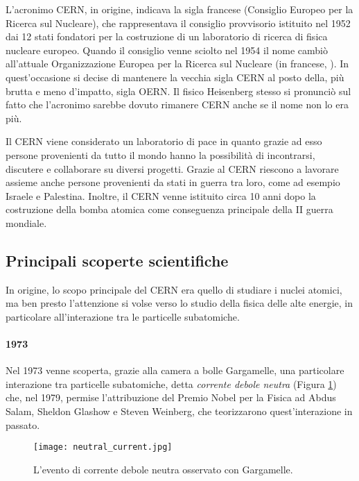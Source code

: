 		L'acronimo \ac{CERN}, in origine, indicava la sigla francese \emph{} (Consiglio Europeo per la Ricerca sul Nucleare), che rappresentava il consiglio provvisorio istituito nel 1952 dai 12 stati fondatori per la costruzione di un laboratorio di ricerca di fisica nucleare europeo. Quando il consiglio venne sciolto nel 1954 il nome cambiò all'attuale Organizzazione Europea per la Ricerca sul Nucleare (in francese, \emph{}). In quest'occasione si decise di mantenere la vecchia sigla \ac{CERN} al posto della, più brutta e meno d'impatto, sigla \ac{OERN}. Il fisico Heisenberg stesso si pronunciò sul fatto che l'acronimo sarebbe dovuto rimanere \ac{CERN} anche se il nome non lo era più.
		
		Il \ac{CERN} viene considerato un laboratorio di pace in quanto grazie ad esso persone provenienti da tutto il mondo hanno la possibilità di incontrarsi, discutere e collaborare su diversi progetti. Grazie al \ac{CERN} riescono a lavorare assieme anche persone provenienti da stati in guerra tra loro, come ad esempio Israele e Palestina. Inoltre, il \ac{CERN} venne istituito circa 10 anni dopo la costruzione della bomba atomica come conseguenza principale della II guerra mondiale.
		
		\subsection{Principali scoperte scientifiche} \label{subsec:C;s;principali_scoperte_scientifiche}
		
			In origine, lo scopo principale del \ac{CERN} era quello di studiare i nuclei atomici, ma ben presto l'attenzione si volse verso lo studio della fisica delle alte energie, in particolare all'interazione tra le particelle subatomiche.
			
			\paragraph{1973}Nel 1973 venne scoperta, grazie alla camera a bolle Gargamelle, una particolare interazione tra particelle subatomiche, detta \textit{corrente debole neutra} (Figura \ref{fig:corrente_debole_neutra}) che, nel 1979, permise l'attribuzione del Premio Nobel per la Fisica ad Abdus Salam, Sheldon Glashow e Steven Weinberg, che teorizzarono quest'interazione in passato.
			
			\begin{figure}[h!]
				\begin{center}
					\texttt{[image: neutral\_current.jpg]}
				\end{center}
				\caption[Corrente debole neutra]{L'evento di corrente debole neutra osservato con Gargamelle.}
				\label{fig:corrente_debole_neutra}
			\end{figure}
			
